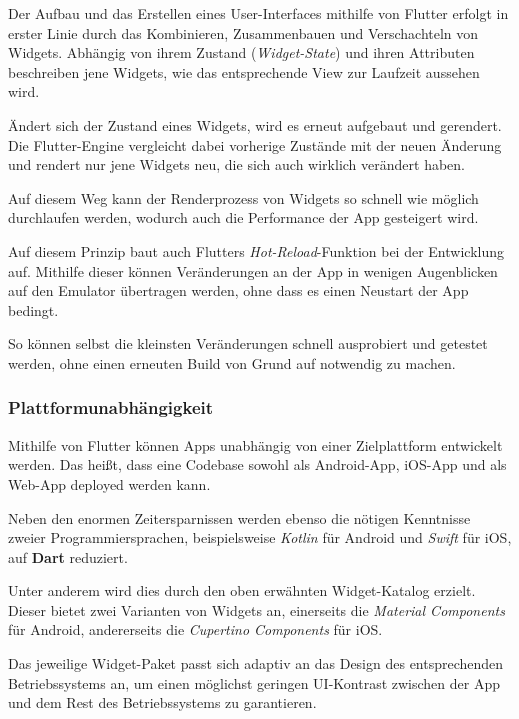 Der Aufbau und das Erstellen eines User-Interfaces mithilfe von Flutter erfolgt in erster Linie
durch das Kombinieren, Zusammenbauen und Verschachteln von Widgets.
Abhängig von ihrem Zustand (\textit{Widget-State}) und ihren Attributen beschreiben jene Widgets, wie das entsprechende
View zur Laufzeit aussehen wird.

Ändert sich der Zustand eines Widgets, wird es erneut aufgebaut und gerendert. Die Flutter-Engine 
vergleicht dabei vorherige Zustände mit der neuen Änderung und rendert nur jene Widgets neu, die
sich auch wirklich verändert haben.

Auf diesem Weg kann der Renderprozess von Widgets so schnell wie möglich durchlaufen werden, wodurch auch die Performance der App gesteigert wird.

Auf diesem Prinzip baut auch Flutters \textit{Hot-Reload}-Funktion bei der Entwicklung auf. Mithilfe dieser
können Veränderungen an der App in wenigen Augenblicken auf den Emulator übertragen werden, ohne dass es einen
Neustart der App bedingt.

So können selbst die kleinsten Veränderungen schnell ausprobiert und getestet werden, ohne einen erneuten Build von Grund auf notwendig zu machen.

\subsubsection{Plattformunabhängigkeit}

Mithilfe von Flutter können Apps unabhängig von einer Zielplattform entwickelt werden. Das heißt, dass eine Codebase
sowohl als Android-App, iOS-App und als Web-App deployed werden kann.

Neben den enormen Zeitersparnissen werden ebenso die nötigen Kenntnisse zweier Programmiersprachen, beispielsweise
\textit{Kotlin} für Android und \textit{Swift} für iOS, auf \textbf{Dart} reduziert.

Unter anderem wird dies durch den oben erwähnten Widget-Katalog erzielt. Dieser bietet zwei Varianten
von Widgets an, einerseits die \textit{Material Components} für Android, andererseits die \textit{Cupertino Components}
für iOS.

Das jeweilige Widget-Paket passt sich adaptiv an das Design des entsprechenden Betriebssystems an, um einen möglichst
geringen UI-Kontrast zwischen der App und dem Rest des Betriebssystems zu garantieren.


